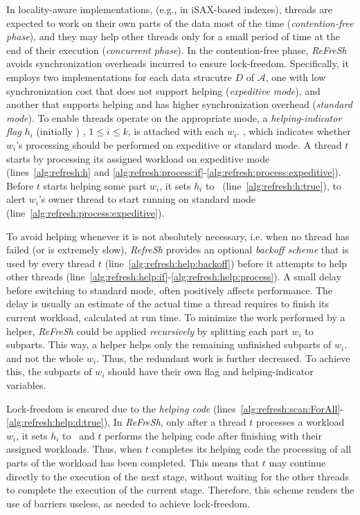 In locality-aware implementations, (e.g., in iSAX-based indexes), threads are expected to work
on their own parts of the data most of the time ({\em contention-free phase}), and they
may help other threads only for a small period of time at the end of their execution
({\em concurrent phase}).
In the contention-free phase, \textit{ReFreSh} avoids synchronization overheads incurred to
ensure lock-freedom. 
Specifically, it employs two implementations for each data strucutre $D$ of  $\mathcal{A}$,
one with low synchronization cost that does not support helping ({\em expeditive mode}),
and another that supports helping and has higher synchronization overhead ({\em standard mode}).  
To enable threads operate on the appropriate mode,  a {\em helping-indicator flag} $h_i$ 
(initially \False) , $1 \leq i \leq k$, is attached with each $w_i$. , which indicates whether 
$w_i$'s processing should be performed on expeditive or standard mode.
% 
A thread $t$ starts by processing its assigned workload 
on expeditive mode (lines~\ref{alg:refresh:h} and \ref{alg:refresh:process:if}-\ref{alg:refresh:process:expeditive}).
Before $t$ starts helping some part $w_i$, it sets $h_i$ to \True\ (line~\ref{alg:refresh:h:true}),
to alert $w_i$'s owner thread to start running on standard mode (line~\ref{alg:refresh:process:expeditive}).

To avoid helping whenever it is not absolutely necessary, i.e. when no thread has
failed (or is extremely slow), \textit{RefreSh} provides an optional {\em backoff scheme} that is used
by every thread $t$ (line~\ref{alg:refresh:help:backoff}) 
before it attempts to help other threads (line~\ref{alg:refresh:help:if}-\ref{alg:refresh:help:process}).
A small delay before switching to standard mode, often positively affects performance.
The delay is usually an estimate of the actual time a thread requires to finish its
current workload, calculated at run time.
% 
To minimize the work performed by a helper, \textit{ReFreSh} could
be applied  {\em recursively} by splitting each part $w_i$ to subparts. 
This way, a helper helps only the remaining unfinished subparts of $w_i$.
and not the whole $w_i$. Thus, the redundant work is further decreased. 
To achieve this, the subparts of $w_i$ should have their own flag and helping-indicator variables.

Lock-freedom is ensured due to the {\em helping code} (lines~\ref{alg:refresh:scan:ForAll}-
\ref{alg:refresh:help:d:true}), In \textit{ReFreSh}, only after a thread
$t$ processes a workload $w_i$, it sets $h_i$ to \True\, and $t$ performs 
the helping code after finishing with their assigned workloads. Thus, when $t$ completes
its helping code the processing of all parts of the workload has been completed. 
This means that $t$ may continue directly to the execution of the next stage, without
waiting for the other threads to complete the execution of the current stage. 
Therefore, this scheme renders the use of barriers useless, as needed to achieve lock-freedom. 

